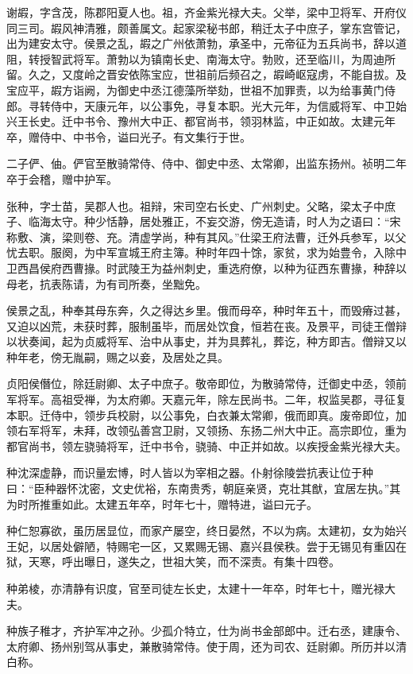 \documentclass[]{article}
\begin{document}
谢嘏，字含茂，陈郡阳夏人也。祖，齐金紫光禄大夫。父举，梁中卫将军、开府仪同三司。嘏风神清雅，颇善属文。起家梁秘书郎，稍迁太子中庶子，掌东宫管记，出为建安太守。侯景之乱，嘏之广州依萧勃，承圣中，元帝征为五兵尚书，辞以道阻，转授智武将军。萧勃以为镇南长史、南海太守。勃败，还至临川，为周迪所留。久之，又度岭之晋安依陈宝应，世祖前后频召之，嘏崎岖寇虏，不能自拔。及宝应平，嘏方诣阙，为御史中丞江德藻所举劾，世祖不加罪责，以为给事黄门侍郎。寻转侍中，天康元年，以公事免，寻复本职。光大元年，为信威将军、中卫始兴王长史。迁中书令、豫州大中正、都官尚书，领羽林监，中正如故。太建元年卒，赠侍中、中书令，谥曰光子。有文集行于世。

二子俨、伷。俨官至散骑常侍、侍中、御史中丞、太常卿，出监东扬州。祯明二年卒于会稽，赠中护军。

张种，字士苗，吴郡人也。祖辩，宋司空右长史、广州刺史。父略，梁太子中庶子、临海太守。种少恬静，居处雅正，不妄交游，傍无造请，时人为之语曰：``宋称敷、演，梁则卷、充。清虚学尚，种有其风。''仕梁王府法曹，迁外兵参军，以父忧去职。服阕，为中军宣城王府主簿。种时年四十馀，家贫，求为始豊令，入除中卫西昌侯府西曹掾。时武陵王为益州刺史，重选府僚，以种为征西东曹掾，种辞以母老，抗表陈请，为有司所奏，坐黜免。

侯景之乱，种奉其母东奔，久之得达乡里。俄而母卒，种时年五十，而毁瘠过甚，又迫以凶荒，未获时葬，服制虽毕，而居处饮食，恒若在丧。及景平，司徒王僧辩以状奏闻，起为贞威将军、治中从事史，并为具葬礼，葬讫，种方即吉。僧辩又以种年老，傍无胤嗣，赐之以妾，及居处之具。

贞阳侯僭位，除廷尉卿、太子中庶子。敬帝即位，为散骑常侍，迁御史中丞，领前军将军。高祖受禅，为太府卿。天嘉元年，除左民尚书。二年，权监吴郡，寻征复本职。迁侍中，领步兵校尉，以公事免，白衣兼太常卿，俄而即真。废帝即位，加领右军将军，未拜，改领弘善宫卫尉，又领扬、东扬二州大中正。高宗即位，重为都官尚书，领左骁骑将军，迁中书令，骁骑、中正并如故。以疾授金紫光禄大夫。

种沈深虚静，而识量宏博，时人皆以为宰相之器。仆射徐陵尝抗表让位于种曰：``臣种器怀沈密，文史优裕，东南贵秀，朝庭亲贤，克壮其猷，宜居左执。''其为时所推重如此。太建五年卒，时年七十，赠特进，谥曰元子。

种仁恕寡欲，虽历居显位，而家产屡空，终日晏然，不以为病。太建初，女为始兴王妃，以居处僻陋，特赐宅一区，又累赐无锡、嘉兴县侯秩。尝于无锡见有重囚在狱，天寒，呼出曝日，遂失之，世祖大笑，而不深责。有集十四卷。

种弟棱，亦清静有识度，官至司徒左长史，太建十一年卒，时年七十，赠光禄大夫。

种族子稚才，齐护军冲之孙。少孤介特立，仕为尚书金部郎中。迁右丞，建康令、太府卿、扬州别驾从事史，兼散骑常侍。使于周，还为司农、廷尉卿。所历并以清白称。
\end{document}

